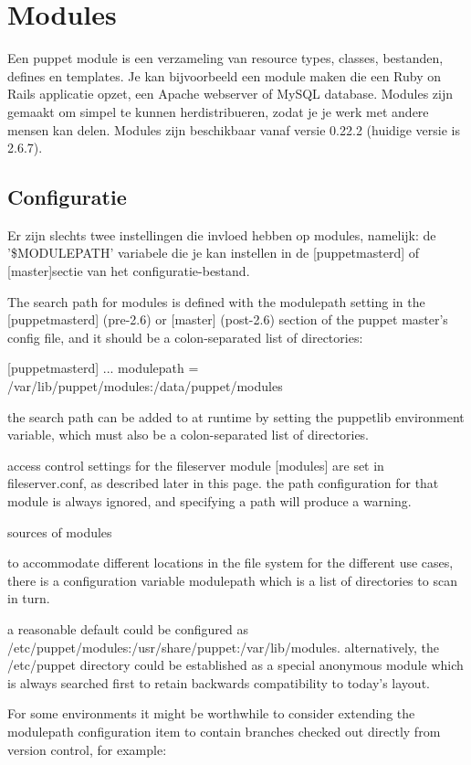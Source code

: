 \chapter{Modules}

Een puppet module is een verzameling van resource types, classes, bestanden, defines en templates. Je kan bijvoorbeeld een module maken die een Ruby on Rails applicatie opzet, een Apache webserver of MySQL database. Modules zijn gemaakt om simpel te kunnen herdistribueren, zodat je je werk met andere mensen kan delen. Modules zijn beschikbaar vanaf versie 0.22.2 (huidige versie is 2.6.7).
%
\section{Configuratie}
Er zijn slechts twee instellingen die invloed hebben op modules, namelijk: de '\$MODULEPATH' variabele die je kan instellen in de [puppetmasterd] of [master]sectie van het configuratie-bestand.

    The search path for modules is defined with the modulepath setting in the [puppetmasterd] (pre-2.6) or [master] (post-2.6) section of the puppet master's config file, and it should be a colon-separated list of directories:

    [puppetmasterd]
    ...
    modulepath = /var/lib/puppet/modules:/data/puppet/modules

    the search path can be added to at runtime by setting the puppetlib environment variable, which must also be a colon-separated list of directories.

    access control settings for the fileserver module [modules] are set in fileserver.conf, as described later in this page. the path configuration for that module is always ignored, and specifying a path will produce a warning.

sources of modules

to accommodate different locations in the file system for the different use cases, there is a configuration variable modulepath which is a list of directories to scan in turn.

a reasonable default could be configured as /etc/puppet/modules:/usr/share/puppet:/var/lib/modules. alternatively, the /etc/puppet directory could be established as a special anonymous module which is always searched first to retain backwards compatibility to today's layout.

For some environments it might be worthwhile to consider extending the modulepath configuration item to contain branches checked out directly from version control, for example:

